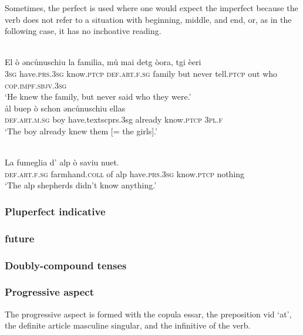 Sometimes, the perfect is used where one would expect the imperfect because the verb does not refer to a situation with beginning, middle, and end, or, as in the following case, it has no inchoative reading.

\ea\label{}
 {\citealt[139]{Büchli1966}}\\
\gll    El ò ǝncůnuschiu la familia, mů mai detg òora, tgi èeri \\
     \textsc{3sg} have.\textsc{prs.3sg} know.\textsc{ptcp} \textsc{def.art.f.sg} family but never tell.\textsc{ptcp} out who \textsc{cop.impf.sbjv.3sg}\\
\glt `He knew the family, but never said who they were.'
\z
\ea\label{}
 {\citealt[103]{Büchli1966}}\\
\gll   ål buep ò schon ǝncůnuschiu ellas \\
     \textsc{def.art.m.sg} boy have.textsc{prs.3sg} already know.\textsc{ptcp} \textsc{3pl.f}\\
\glt `The boy already knew them [= the girls].'
\z

\ea\label{}
 {\citealt[53]{Büchli1966}}\\
\gll    La fumeglia d’ alp ò saviu nuet.\\
     \textsc{def.art.f.sg} farmhand.\textsc{coll} of alp have.\textsc{prs.3sg} know.\textsc{ptcp} nothing\\
\glt `The alp shepherds didn’t know anything.'
\z



\subsubsection{Pluperfect indicative}


\subsubsection{future}

\subsubsection{Doubly-compound tenses}

\subsubsection{Progressive aspect}
The progressive aspect is formed with the copula essar, the preposition vid ‘at’, the definite article masculine singular, and the infinitive of the verb.

